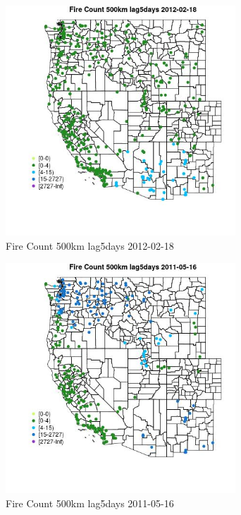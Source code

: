 \begin{figure} 
\centering  
\includegraphics[width=0.77\textwidth]{Code_Outputs/Report_ML_input_PM25_Step4_part_f_de_duplicated_aveswNAs_MapObsFire_Count_500km_lag5days2012-02-18.jpg} 
\caption{\label{fig:Report_ML_input_PM25_Step4_part_f_de_duplicated_aveswNAsMapObsFire_Count_500km_lag5days2012-02-18}Fire Count 500km lag5days 2012-02-18} 
\end{figure} 
 

\begin{figure} 
\centering  
\includegraphics[width=0.77\textwidth]{Code_Outputs/Report_ML_input_PM25_Step4_part_f_de_duplicated_aveswNAs_MapObsFire_Count_500km_lag5days2011-05-16.jpg} 
\caption{\label{fig:Report_ML_input_PM25_Step4_part_f_de_duplicated_aveswNAsMapObsFire_Count_500km_lag5days2011-05-16}Fire Count 500km lag5days 2011-05-16} 
\end{figure} 
 

